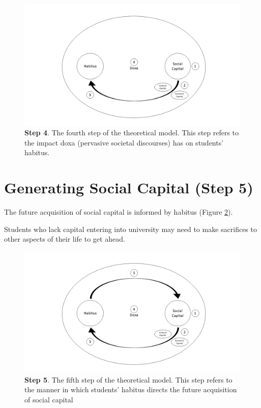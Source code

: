 \begin{figure}[ht]
\centering
\includegraphics[width=\textwidth]{C5 - Understanding Capital Accumulation/HabitusSocCap_TheoreticalModel4.png}
\caption{\label{fig:TheoreticalModel4_C5}\textbf{Step 4}. The fourth step of the theoretical model. This step refers to the impact doxa (pervasive societal discourses) has on students' habitus.}
\end{figure}

\section{Generating Social Capital (Step 5)}
The future acquisition of social capital is informed by habitus (Figure \ref{fig:TheoreticalModel5_C5}). 

Students who lack capital entering into university may need to make sacrifices to other aspects of their life to get ahead. 

\begin{figure}[ht]
\centering
\includegraphics[width=\textwidth]{C5 - Understanding Capital Accumulation/HabitusSocCap_TheoreticalModel5.png}
\caption{\label{fig:TheoreticalModel5_C5}\textbf{Step 5}. The fifth step of the theoretical model. This step refers to the manner in which students' habitus directs the future acquisition of social capital}
\end{figure}



